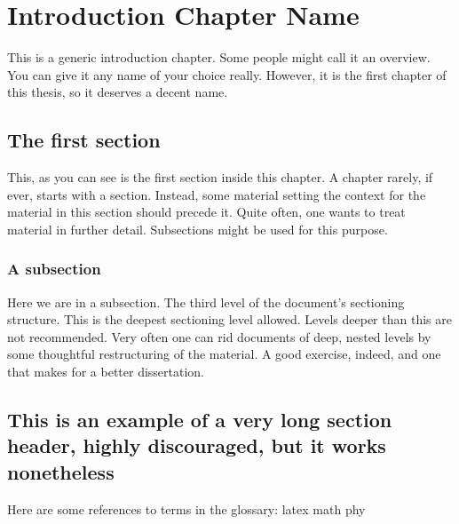\chapter{Introduction Chapter Name}
This is a generic introduction chapter. Some people might call it an overview.
You can give it any name of your choice really. However, it is the first
chapter of this thesis, so it deserves a decent name.

\section{The first section}
This, as you can see is the first section inside this chapter. A chapter
rarely, if ever, starts with a section. Instead, some material setting the
context for the material in this section should precede it. Quite often, one
wants to treat material in further detail. Subsections might be used for this
purpose.

\subsection{A subsection}
Here we are in a subsection. The third level of the document's sectioning
structure. This is the deepest sectioning level allowed. Levels deeper than this are not
recommended. Very often one can rid documents of deep, nested levels by some
thoughtful restructuring of the material. A good exercise, indeed, and one that
makes for a better dissertation.


\section{This is an example of a very long section header, highly discouraged,
but it works nonetheless}

Here are some references to terms in the glossary:
\gls{latex} \gls{math} \gls{phy}